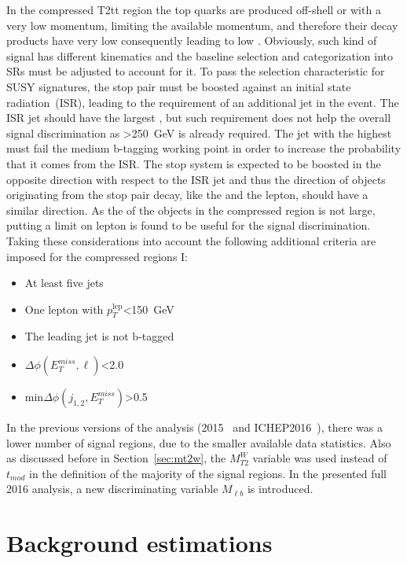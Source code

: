 In the compressed T2tt region the top quarks are produced off-shell or with a very low momentum, limiting the available momentum,  and therefore their decay products have very low \pt consequently leading to  low \MET. Obviously, such kind of signal has different kinematics and the baseline selection and categorization into SRs must be adjusted to account for it. To pass the \MET selection characteristic for SUSY signatures, the stop pair must be boosted against an initial state radiation~(ISR), leading to the requirement of  an additional jet in the event. The ISR jet should have the largest \pt, but such requirement does not help the overall signal discrimination as \MET>250~GeV is already required. The jet with the highest \pt must fail the medium b-tagging working point in order to increase the probability that it comes from the ISR. The stop system is expected to be boosted in the opposite direction with respect to the ISR jet and thus the direction of objects originating from the stop pair decay, like the \MET and the lepton, should have a similar direction. As the \pt of the objects in the compressed region is not large, putting a limit on lepton \pt is found to be useful for the signal discrimination. Taking these considerations into account the following additional criteria are imposed for the compressed regions I: 

\begin{itemize}
\item At least five jets
\item One lepton with $p_{T}^{\mathrm{lep}}$<150~GeV
\item The leading jet is not b-tagged
\item $\Delta \phi(E_{T}^{miss}, \ell)$<2.0 
\item min$\Delta \phi (j_{1,2}, E_{T}^{miss})$>0.5
\end{itemize}

In the previous versions of the analysis (2015~\cite{Sirunyan:2016jpr} and ICHEP2016~\cite{CMS:2016vew}), there was a lower number of signal regions, due to the smaller available data statistics. Also as discussed before in Section~\ref{sec:mt2w}, the $M_{T2}^{W}$ variable was used instead of $t_{mod}$ in the definition of the majority of the signal regions. In the presented full 2016 analysis, a new discriminating variable $M_{\ell b}$ is introduced. %


\section{Background estimations~\label{sec:estimations}}

